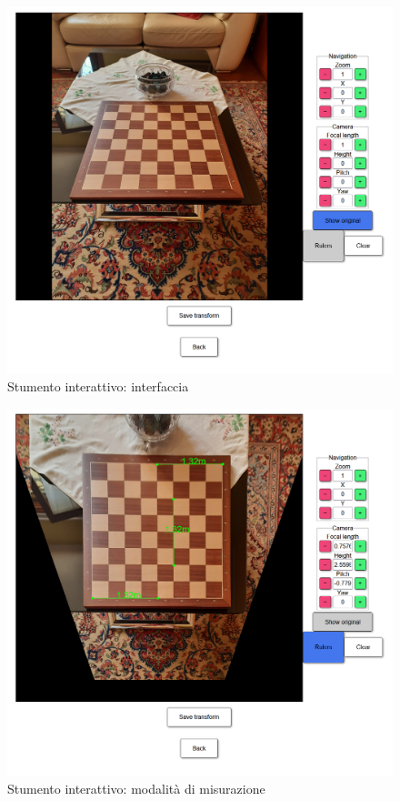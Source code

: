 \begin{figure}
    \caption{Stumento interattivo: interfaccia}
    \label{fig:tool view}
    \centering
    \includegraphics[height=.44\textheight]{images/tool orig.png}
\end{figure}

\begin{figure}
    \caption{Stumento interattivo: modalità di misurazione}
    \label{fig:tool measure}
    \centering
    \includegraphics[height=.44\textheight]{images/tool measure.png}
\end{figure}


